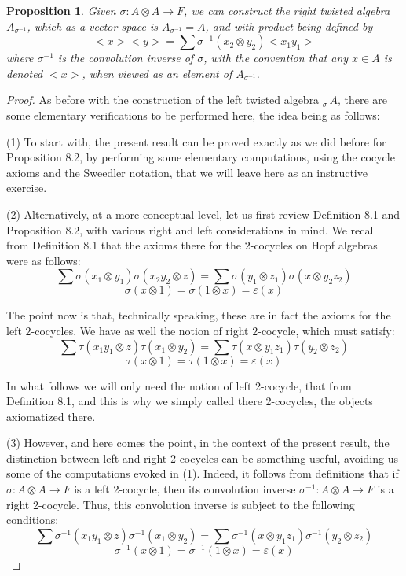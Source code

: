 \documentclass[12pt]{amsbook}
\newtheorem{proposition}[theorem]{Proposition}
\begin{document}
\begin{proposition}
Given $\sigma:A\otimes A\to F$, we can construct the right twisted algebra $A_{\sigma^{-1}}$, which as a vector space is $A_{\sigma^{-1}}=A$, and with product being defined by 
$$<x ><y>=\sum\sigma^{-1}(x_2\otimes y_2)<x_1y_1>$$
where $\sigma^{-1}$ is the convolution inverse of $\sigma$, with the convention that any $x\in A$ is denoted $<x>$, when viewed as an element of $A_{\sigma^{-1}}$.
\end{proposition}

\begin{proof}
As before with the construction of the left twisted algebra $_{\sigma}\!\,A$, there are some elementary verifications to be performed here, the idea being as follows:

\medskip

(1) To start with, the present result can be proved exactly as we did before for Proposition 8.2, by performing some elementary computations, using the cocycle axioms and the Sweedler notation, that we will leave here as an instructive exercise. 

\medskip

(2) Alternatively, at a more conceptual level, let us first review Definition 8.1 and Proposition 8.2, with various right and left considerations in mind. We recall from Definition 8.1 that the axioms there for the $2$-cocycles on Hopf algebras were as follows:
$$\sum\sigma(x_1\otimes y_1)\sigma(x_2y_2\otimes z)=\sum\sigma(y_1\otimes z_1)\sigma(x\otimes y_2z_2)$$
$$\sigma(x\otimes 1)=\sigma(1\otimes x)=\varepsilon(x)$$

The point now is that, technically speaking, these are in fact the axioms for the left $2$-cocycles. We have as well the notion of right $2$-cocycle, which must satisfy:
$$\sum\tau(x_1y_1\otimes z)\tau(x_1\otimes y_2)=\sum\tau(x\otimes y_1z_1)\tau(y_2\otimes z_2)$$
$$\tau(x\otimes 1)=\tau(1\otimes x)=\varepsilon(x)$$

In what follows we will only need the notion of left 2-cocycle, that from Definition 8.1, and this is why we simply called there 2-cocycles, the objects axiomatized there.

\medskip

(3) However, and here comes the point, in the context of the present result, the distinction between left and right 2-cocycles can be something useful, avoiding us some of the computations evoked in (1). Indeed, it follows from definitions that if $\sigma:A\otimes A\to F$ is a left 2-cocycle, then its convolution inverse $\sigma^{-1}:A\otimes A\to F$ is a right 2-cocycle. Thus, this convolution inverse is subject to the following conditions:
$$\sum\sigma^{-1}(x_1y_1\otimes z)\sigma^{-1}(x_1\otimes y_2)=\sum\sigma^{-1}(x\otimes y_1z_1)\sigma^{-1}(y_2\otimes z_2)$$
$$\sigma^{-1}(x\otimes 1)=\sigma^{-1}(1\otimes x)=\varepsilon(x)$$


\end{proof}
\end{document}
